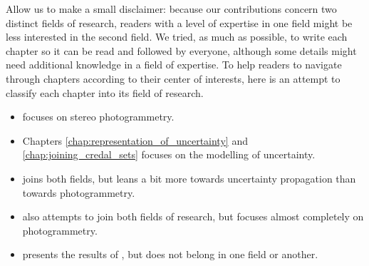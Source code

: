 Allow us to make a small disclaimer: because our contributions concern two distinct fields of research, readers with a level of expertise in one field might be less interested in the second field. We tried, as much as possible, to write each chapter so it can be read and followed by everyone, although some details might need additional knowledge in a field of expertise. To help readers to navigate through chapters according to their center of interests, here is an attempt to classify each chapter into its field of research.
\begin{itemize}
    \item {} focuses on stereo photogrammetry.
    \item Chapters \ref{chap:representation_of_uncertainty} and \ref{chap:joining_credal_sets} focuses on the modelling of uncertainty.
    \item {} joins both fields, but leans a bit more towards uncertainty propagation than towards photogrammetry. 
    \item {} also attempts to join both fields of research, but focuses almost completely on photogrammetry.
    \item {} presents the results of , but does not belong in one field or another.
\end{itemize}

